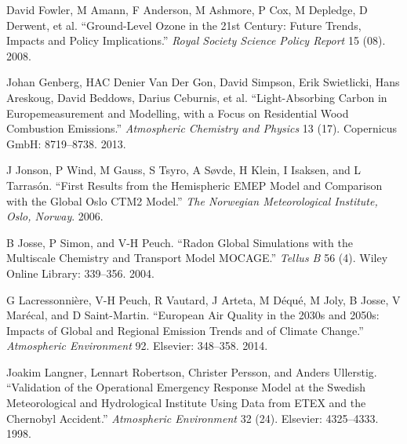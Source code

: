 \documentclass[9pt]{report}
\begin{document}
{\begin{thebibliography}{34}
David Fowler, M Amann, F Anderson, M Ashmore, P Cox, M Depledge, D Derwent, et al. \textquotedblleft{}Ground-Level Ozone in the 21st Century: Future Trends, Impacts and Policy Implications.\textquotedblright{} \emph{Royal Society Science Policy Report} 15 (08). 2008.\label{fowler2008ground}%

Johan Genberg, HAC Denier Van Der Gon, David Simpson, Erik Swietlicki, Hans Areskoug, David Beddows, Darius Ceburnis, et al. \textquotedblleft{}Light-Absorbing Carbon in Europe\textendash{}measurement and Modelling, with a Focus on Residential Wood Combustion Emissions.\textquotedblright{} \emph{Atmospheric Chemistry and Physics} 13 (17). Copernicus GmbH: 8719–8738. 2013.\label{genberg2013light}%

J Jonson, P Wind, M Gauss, S Tsyro, A S\o{}vde, H Klein, I Isaksen, and L Tarras\'{o}n. \textquotedblleft{}First Results from the Hemispheric EMEP Model and Comparison with the Global Oslo CTM2 Model.\textquotedblright{} \emph{The Norwegian Meteorological Institute, Oslo, Norway}. 2006.\label{jonson2006first}%

B Josse, P Simon, and V-H Peuch. \textquotedblleft{}Radon Global Simulations with the Multiscale Chemistry and Transport Model MOCAGE.\textquotedblright{} \emph{Tellus B} 56 (4). Wiley Online Library: 339–356. 2004.\label{josse2004radon}%

G Lacressonni\`{e}re, V-H Peuch, R Vautard, J Arteta, M D\'{e}qu\'{e}, M Joly, B Josse, V Mar\'{e}cal, and D Saint-Martin. \textquotedblleft{}European Air Quality in the 2030s and 2050s: Impacts of Global and Regional Emission Trends and of Climate Change.\textquotedblright{} \emph{Atmospheric Environment} 92. Elsevier: 348–358. 2014.\label{lacressonniere2014european}%

Joakim Langner, Lennart Robertson, Christer Persson, and Anders Ullerstig. \textquotedblleft{}Validation of the Operational Emergency Response Model at the Swedish Meteorological and Hydrological Institute Using Data from ETEX and the Chernobyl Accident.\textquotedblright{} \emph{Atmospheric Environment} 32 (24). Elsevier: 4325–4333. 1998.\label{langner1998validation}%


\end{thebibliography}}
\end{document}
